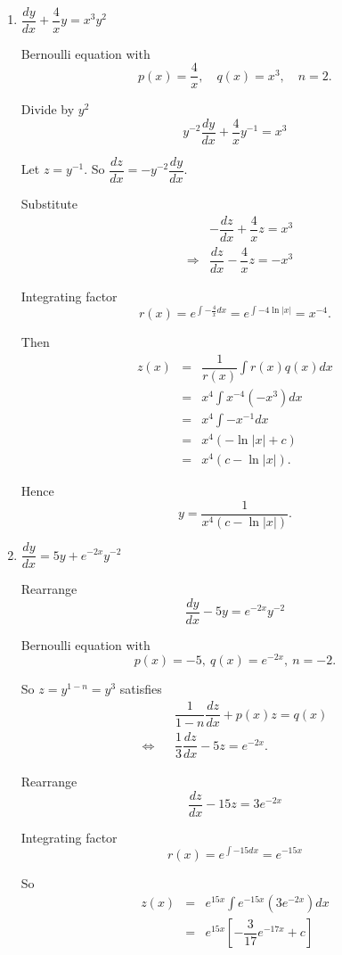 \begin{examples}\
\begin{enumerate}
 
 \item $\dfrac{dy}{dx} + \dfrac{4}{x}y = x^3 y^2$
 
 Bernoulli equation with
 \[
  p(x)=\dfrac{4}{x}, \quad q(x)=x^3, \quad n=2.
 \]

 Divide by $y^2$
 \[
  y^{-2} \dfrac{dy}{dx} + \dfrac{4}{x} y^{-1} = x^3
 \]
 
 Let $z=y^{-1}$. So
$
  \dfrac{dz}{dx} = -y^{-2} \dfrac{dy}{dx}.
$

 Substitute
 \begin{eqnarray*}
  && -\dfrac{dz}{dx} + \dfrac{4}{x} z = x^{3}\\
  &\Rightarrow& \dfrac{dz}{dx} - \dfrac{4}{x} z = -x^{3}
 \end{eqnarray*}

 Integrating factor
 \[
  r(x) = e^{\int -\frac{4}{x}dx} = e^{\int -4\ln\left|x\right|} = x^{-4}.
 \]

 Then
 \begin{eqnarray*}
  z(x) &=& \dfrac{1}{r(x)} \int r(x) q(x) dx\\
  &=& x^4 \int x^{-4}(-x^3)dx\\
  &=& x^4 \int -x^{-1}dx\\
  &=& x^4 (-\ln\left|x\right|+c)\\
  &=& x^4 (c-\ln\left|x\right|).
 \end{eqnarray*}

 Hence
 \[
  y=\dfrac{1}{x^4(c-\ln\left|x\right|)}.
 \]



 \item $\dfrac{dy}{dx} = 5y + e^{-2x}y^{-2}$
 
 Rearrange 
 \[
  \dfrac{dy}{dx} - 5y = e^{-2x} y^{-2}
 \]

 Bernoulli equation with $$p(x)=-5,\ q(x)=e^{-2x},\ n=-2.$$

So $z=y^{1-n}=y^{3}$ satisfies
\begin{eqnarray*}
&& \dfrac{1}{1-n} \dfrac{dz}{dx} + p(x) z= q(x)\\
\iff&&
  \dfrac{1}{3} \dfrac{dz}{dx} - 5z = e^{-2x}.
\end{eqnarray*}

Rearrange 
\[
 \dfrac{dz}{dx} - 15z = 3e^{-2x}
\]


 Integrating factor
 \[
  r(x) = e^{\int -15dx} = e^{-15x}
 \]

 So
 \begin{eqnarray*}
  z(x) &=& e^{15x} \int e^{-15x} (3e^{-2x})dx\\
  &=& e^{15x} \left[ -\dfrac{3}{17} e^{-17x} + c \right]
 \end{eqnarray*}


\end{enumerate}
\end{examples}
